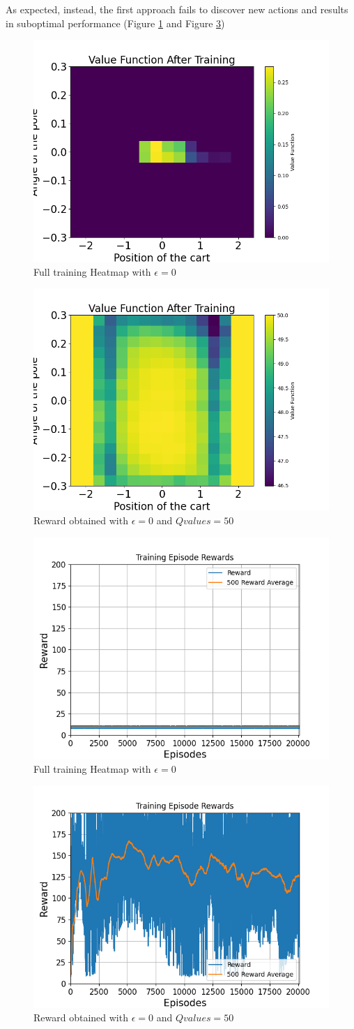 \documentclass{article}
\begin{document}
As expected, instead, the first approach fails to discover new actions and results in suboptimal performance (Figure \ref{fig:heatmap_zero} and Figure \ref{fig:reward_zero})

\begin{figure}[h]
		\centering
		\includegraphics[height=0.28\linewidth]{../data/plot/heatmap_full_training_zero_epsilon.png}
		\caption{Full training Heatmap with $\epsilon = 0$ }
		\label{fig:heatmap_zero}
\end{figure}

\begin{figure}[h]
	\centering
	\includegraphics[height=0.28\linewidth]{../data/plot/heatmap_full_training_zero_epsilon_fifty_initial.png}
	\caption{Reward obtained with $\epsilon = 0$ and $Q values = 50$}
	\label{fig:heatmap_zero_fifty}
\end{figure}

\begin{figure}[h]
	\centering
	\includegraphics[height=0.28\linewidth]{../data/plot/q_learning_zero_epsilon.png}
	\caption{Full training Heatmap with $\epsilon = 0$ }
	\label{fig:reward_zero}
\end{figure}


\begin{figure}[h]
		\centering
		\includegraphics[height=0.28\linewidth]{../data/plot/q_learning_zero_epsilon_fifty_initial.png}
		\caption{Reward obtained with $\epsilon = 0$ and $Q values = 50$}
		\label{fig:reward_zero_fifty}
\end{figure}
\end{document}
